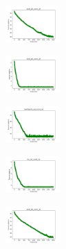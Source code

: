 \begin{figure}[H]
\begin{subfigure}
    \end{subfigure}
    \hfill
    \begin{subfigure}
        \centering
        \includegraphics[width=0.234\textwidth]{img/aggun/ecoli_set_const_10_589741062_cost.png}
    \end{subfigure}
    \hfill
    \begin{subfigure}
        \centering
        \includegraphics[width=0.234\textwidth]{img/aggun/rand_set_const_10_589741062_cost.png}
    \end{subfigure}
    \hfill
    \begin{subfigure}
        \centering
        \includegraphics[width=0.234\textwidth]{img/aggun/newthyroid_set_const_10_589741062_cost.png}
    \end{subfigure}
    \hfill
    \begin{subfigure}
        \centering
        \includegraphics[width=0.234\textwidth]{img/aggun/iris_set_const_10_277451237_cost.png}
    \end{subfigure}
    \hfill
    \begin{subfigure}
        \centering
        \includegraphics[width=0.234\textwidth]{img/aggun/ecoli_set_const_10_277451237_cost.png}
    \end{subfigure}
    \hfill

\end{figure}
